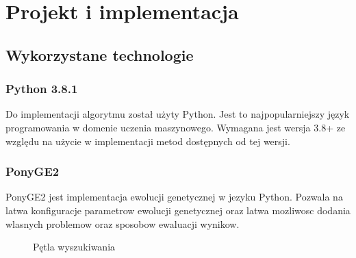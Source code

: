 \chapter{Projekt i implementacja}

\section{Wykorzystane technologie}
\subsection{Python 3.8.1}
Do implementacji algorytmu został użyty Python. Jest to najpopularniejszy język programowania w domenie uczenia maszynowego. Wymagana jest wersja 3.8+ ze względu na użycie w implementacji metod dostępnych od tej wersji.  
\subsection{PonyGE2}
PonyGE2 \cite{Fenton_2017} jest implementacja ewolucji genetycznej w jezyku Python. Pozwala na latwa konfiguracje parametrow ewolucji genetycznej oraz latwa mozliwosc dodania wlasnych problemow oraz sposobow ewaluacji wynikow.

\begin{figure}[h]
	\caption{\label{fig:subcaption_example}Pętla wyszukiwania}
\end{figure}

